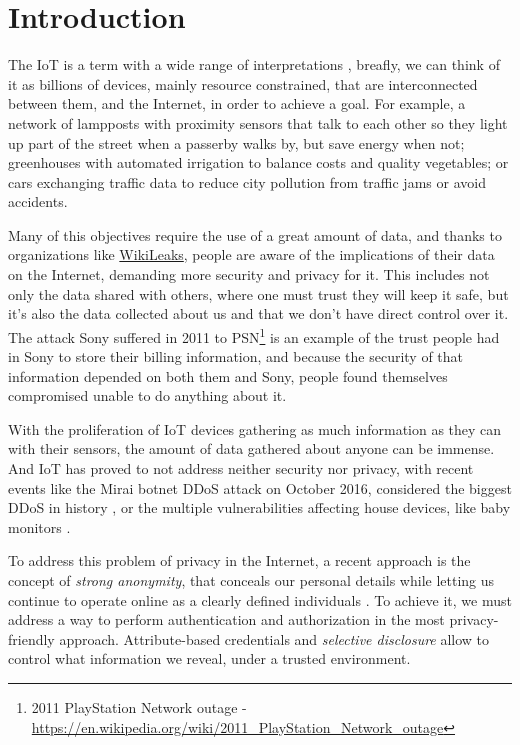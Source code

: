 \chapter{Introduction}\label{ch:introduction}

The \ac{IoT} is a term with a wide range of interpretations \citep{Atzori20102787}, breafly, we can think of it as billions of devices, mainly resource constrained, that are interconnected between them, and the Internet, in order to achieve a goal. For example, a network of lampposts with proximity sensors that talk to each other so they light up part of the street when a passerby walks by, but save energy when not; greenhouses with automated irrigation to balance costs and quality vegetables; or cars exchanging traffic data to reduce city pollution from traffic jams or avoid accidents.

Many of this objectives require the use of a great amount of data, and thanks to organizations like \href{https://wikileaks.org/}{WikiLeaks}, people are aware of the implications of their data on the Internet, demanding more security and privacy for it. This includes not only the data shared with others, where one must trust they will keep it safe, but it's also the data collected about us and that we don't have direct control over it. The attack Sony suffered in 2011 to PSN\footnote{2011 PlayStation Network outage - 
\url{https://en.wikipedia.org/wiki/2011_PlayStation_Network_outage}} is an example of the trust people had in Sony to store their billing information, and because the security of that information depended on both them and Sony, people found themselves compromised unable to do anything about it. 

With the proliferation of IoT devices gathering as much information as they can with their sensors, the amount of data gathered about anyone can be immense. And IoT has proved to not address neither security nor privacy, with recent events like the Mirai botnet DDoS attack on October 2016, considered the biggest DDoS in history \citep{jeyanthi:2017}, or the multiple vulnerabilities affecting house devices, like baby monitors \citep{rapid7babycam}.


To address this problem of privacy in the Internet, a recent approach is the concept of \textit{strong anonymity}, that conceals our personal details while letting us continue to operate online as a clearly defined individuals \citep{stronganonymity}. To achieve it, we must address a way to perform authentication and authorization in the most privacy-friendly approach. Attribute-based credentials and \textit{selective disclosure} allow to control what information we reveal, under a trusted environment.

